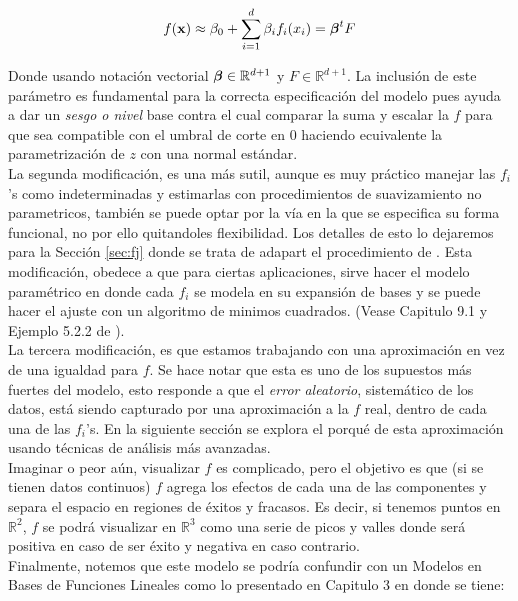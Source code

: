 \documentclass[../Main/Main.tex]{subfiles}
\begin{document}
$$
f(\mathbf{x}) \approx \beta_0 +\sum_{i=1}^d \beta_i f_i(x_i) = \boldsymbol{\beta}^t F
$$

Donde usando notación vectorial $\boldsymbol{\beta}\in\mathbb{R}^{d+1}$ y $F \in\mathbb{R}^{d+1}$. La inclusión de este parámetro es fundamental para la correcta especificación del modelo pues ayuda a dar un \textit{sesgo o nivel} base contra el cual comparar la suma y escalar la $f$ para que sea compatible con el umbral de corte en $0$ haciendo ecuivalente la parametrización de $z$ con una normal estándar. \\

La segunda modificación, es una más sutil, aunque es muy práctico manejar las $f_i$'s como indeterminadas y estimarlas con procedimientos de suavizamiento no parametricos, también se puede optar por la vía en la que se especifica su forma funcional, no por ello quitandoles flexibilidad. Los detalles de esto lo dejaremos para la Sección \ref{sec:fj} donde se trata de adapart el procedimiento de \autocite{mallik1998automatic}. Esta modificación, obedece a que para ciertas aplicaciones, sirve hacer el modelo paramétrico en donde cada $f_i$ se modela en su expansión de bases y se puede hacer el ajuste con un algoritmo de minimos cuadrados. (Vease Capitulo 9.1 y Ejemplo 5.2.2 de \autocite{hastie2008elements}).\\

La tercera modificación, es que estamos trabajando con una aproximación en vez de una igualdad para $f$. Se hace notar que esta es uno de los supuestos más fuertes del modelo, esto responde a que el \textit{error aleatorio}, sistemático de los datos, está siendo capturado por una aproximación a la $f$ real, dentro de cada una de las $f_i$'s. En la siguiente sección se explora el porqué de esta aproximación usando técnicas de análisis más avanzadas.\\

Imaginar o peor aún, visualizar $f$ es complicado, pero el objetivo es que (si se tienen datos continuos) $f$ agrega los efectos de cada una de las componentes y separa el espacio en regiones de éxitos y fracasos. Es decir, si tenemos puntos en $\mathbb{R}^2$, $f$ se podrá visualizar en $\mathbb{R}^3$ como una serie de picos y valles donde será positiva en caso de ser éxito y negativa en caso contrario.\\

Finalmente, notemos que este modelo se podría confundir con un Modelos en Bases de Funciones Lineales como lo presentado en Capitulo 3 en \autocite{bishop2006pattern} donde se tiene:
\end{document}
